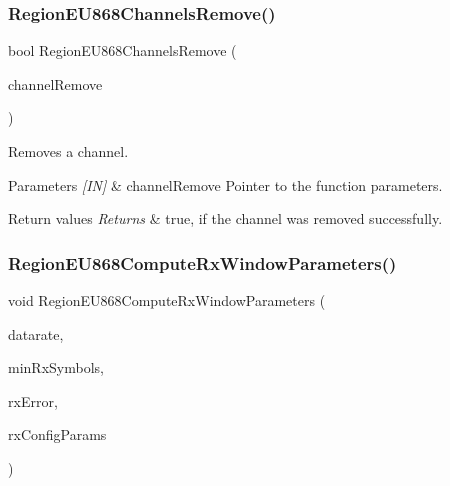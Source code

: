 \subsubsection{\texorpdfstring{Region\+E\+U868\+Channels\+Remove()}{RegionEU868ChannelsRemove()}}
{\footnotesize\ttfamily bool Region\+E\+U868\+Channels\+Remove (\begin{DoxyParamCaption}\item[{\hyperlink{group__REGION_gaa37468560d2fc81a977b57a48e5d72c0}{Channel\+Remove\+Params\+\_\+t} $\ast$}]{channel\+Remove }\end{DoxyParamCaption})}



Removes a channel. 


\begin{DoxyParams}{Parameters}
{\em \mbox{[}\+I\+N\mbox{]}} & channel\+Remove Pointer to the function parameters.\\
\hline
\end{DoxyParams}

\begin{DoxyRetVals}{Return values}
{\em Returns} & true, if the channel was removed successfully. \\
\hline
\end{DoxyRetVals}
\mbox{\label{group__REGIONEU868_ga7650d2866d0b5df186afd4c0dd1f52bb}} 
\subsubsection{\texorpdfstring{Region\+E\+U868\+Compute\+Rx\+Window\+Parameters()}{RegionEU868ComputeRxWindowParameters()}}
{\footnotesize\ttfamily void Region\+E\+U868\+Compute\+Rx\+Window\+Parameters (\begin{DoxyParamCaption}\item[{int8\+\_\+t}]{datarate,  }\item[{uint8\+\_\+t}]{min\+Rx\+Symbols,  }\item[{uint32\+\_\+t}]{rx\+Error,  }\item[{\hyperlink{group__REGION_ga375c038078dfcfc7ef14280021db719e}{Rx\+Config\+Params\+\_\+t} $\ast$}]{rx\+Config\+Params }\end{DoxyParamCaption})}

